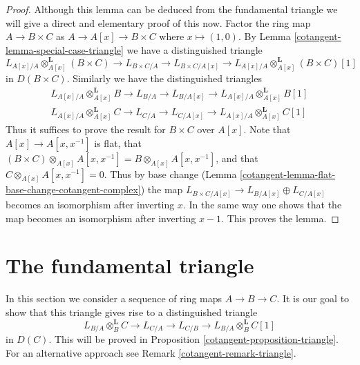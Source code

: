 \begin{proof}

Although this lemma can be deduced from the fundamental triangle
we will give a direct and elementary proof of this now.
Factor the ring map $A \to B \times C$ as $A \to A[x] \to B \times C$
where $x \mapsto (1, 0)$. By Lemma \ref{cotangent-lemma-special-case-triangle}
we have a distinguished triangle
$$
L_{A[x]/A} \otimes_{A[x]}^\mathbf{L} (B \times C) \to L_{B \times C/A} \to
L_{B \times C/A[x]} \to L_{A[x]/A} \otimes_{A[x]}^\mathbf{L} (B \times C)[1]
$$
in $D(B \times C)$. Similarly we have the distinguished triangles
$$
\begin{matrix}
L_{A[x]/A} \otimes_{A[x]}^\mathbf{L} B \to L_{B/A} \to L_{B/A[x]}
\to L_{A[x]/A} \otimes_{A[x]}^\mathbf{L} B[1] \\
L_{A[x]/A} \otimes_{A[x]}^\mathbf{L} C \to L_{C/A} \to L_{C/A[x]}
\to L_{A[x]/A} \otimes_{A[x]}^\mathbf{L} C[1]
\end{matrix}
$$
Thus it suffices to prove the result for $B \times C$ over $A[x]$.
Note that $A[x] \to A[x, x^{-1}]$ is flat, that
$(B \times C) \otimes_{A[x]} A[x, x^{-1}] = B \otimes_{A[x]} A[x, x^{-1}]$,
and that $C \otimes_{A[x]} A[x, x^{-1}] = 0$.
Thus by base change (Lemma \ref{cotangent-lemma-flat-base-change-cotangent-complex})
the map $L_{B \times C/A[x]} \to L_{B/A[x]} \oplus L_{C/A[x]}$
becomes an isomorphism after inverting $x$.
In the same way one shows that the map becomes an isomorphism after
inverting $x - 1$. This proves the lemma.
\end{proof}

\section{The fundamental triangle}
\label{cotangent-section-triangle}
In this section we consider a sequence of ring maps $A \to B \to C$.
It is our goal to show that this triangle gives rise to a distinguished
triangle
\begin{equation}
\label{equation-triangle}
L_{B/A} \otimes_B^\mathbf{L} C \to L_{C/A} \to L_{C/B} \to
L_{B/A} \otimes_B^\mathbf{L} C[1]
\end{equation}
in $D(C)$. This will be proved in Proposition \ref{cotangent-proposition-triangle}.
For an alternative approach see Remark \ref{cotangent-remark-triangle}.

